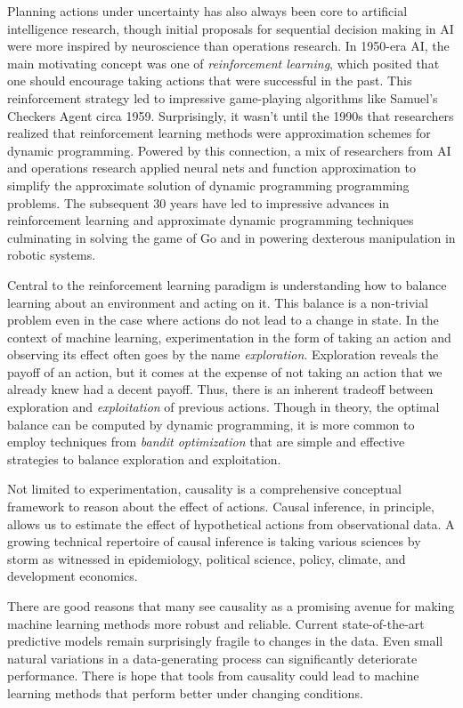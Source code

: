 \documentclass{tufte-book}
\begin{document}
Planning actions under uncertainty has also always been core to
artificial intelligence research, though initial proposals for
sequential decision making in AI were more inspired by neuroscience than
operations research. In 1950-era AI, the main motivating concept was one
of \emph{reinforcement learning}, which posited that one should
encourage taking actions that were successful in the past. This
reinforcement strategy led to impressive game-playing algorithms like
Samuel's Checkers Agent circa 1959. Surprisingly, it wasn't until the
1990s that researchers realized that reinforcement learning methods were
approximation schemes for dynamic programming. Powered by this
connection, a mix of researchers from AI and operations research applied
neural nets and function approximation to simplify the approximate
solution of dynamic programming programming problems. The subsequent 30
years have led to impressive advances in reinforcement learning and
approximate dynamic programming techniques culminating in solving the
game of Go and in powering dexterous manipulation in robotic systems.

Central to the reinforcement learning paradigm is understanding how to
balance learning about an environment and acting on it. This balance is
a non-trivial problem even in the case where actions do not lead to a
change in state. In the context of machine learning, experimentation in
the form of taking an action and observing its effect often goes by the
name \emph{exploration}. Exploration reveals the payoff of an action,
but it comes at the expense of not taking an action that we already knew
had a decent payoff. Thus, there is an inherent tradeoff between
exploration and \emph{exploitation} of previous actions. Though in
theory, the optimal balance can be computed by dynamic programming, it
is more common to employ techniques from \emph{bandit optimization} that
are simple and effective strategies to balance exploration and
exploitation.

Not limited to experimentation, causality is a comprehensive conceptual
framework to reason about the effect of actions. Causal inference, in
principle, allows us to estimate the effect of hypothetical actions from
observational data. A growing technical repertoire of causal inference
is taking various sciences by storm as witnessed in epidemiology,
political science, policy, climate, and development economics.

There are good reasons that many see causality as a promising avenue for
making machine learning methods more robust and reliable. Current
state-of-the-art predictive models remain surprisingly fragile to
changes in the data. Even small natural variations in a data-generating
process can significantly deteriorate performance. There is hope that
tools from causality could lead to machine learning methods that perform
better under changing conditions.
\end{document}
